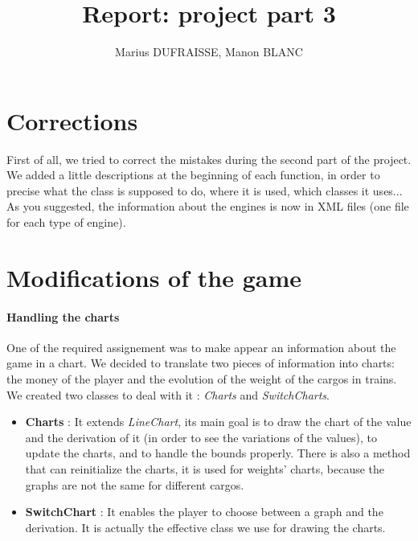 \documentclass[a4paper]{article}
\title{Report: project part 3}
\author{Marius DUFRAISSE, Manon BLANC}
\date{  }
\begin{document}
	\maketitle
	\thispagestyle{fancy}
	\section{Corrections}
	
	First of all, we tried to correct the mistakes during the second part of the project. We added a little descriptions at the beginning of each function, in order to precise what the class is supposed to do, where it is used, which classes it uses... As you suggested, the information about the engines is now in XML files (one file for each type of engine).
	
	\section{Modifications of the game}
	
	\paragraph{Handling the charts} 
	One of the required assignement was to make appear an information about the game in a chart. We decided to translate two pieces of information into charts: the money of the player and the evolution of the weight of the cargos in trains. We created two classes to deal with it : \textit{Charts} and \textit{SwitchCharts}. 
	\begin{itemize}
		\item \textbf{Charts }: It extends \textit{LineChart}, its main goal is to draw the chart of the value and the derivation of it (in order to see the variations of the values), to update the charts, and to handle the bounds properly. There is also a method that can reinitialize the charts, it is used for weights' charts, because the graphs are not the same for different cargos.
		\item \textbf{SwitchChart} : It enables the player to choose between a graph and the derivation. It is actually the effective class we use for drawing the charts.
	\end{itemize} 
	
\end{document}
